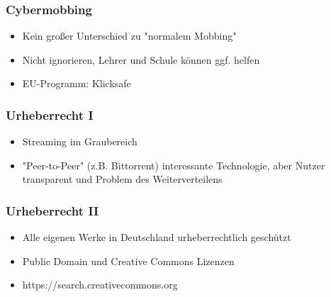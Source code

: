 \begin{frame}
  \frametitle{Cybermobbing}
  \begin{itemize}
    \item<2-> Kein großer Unterschied zu "normalem Mobbing"
    \item<3-> Nicht ignorieren, Lehrer und Schule können ggf. helfen
    \item<4-> EU-Programm: Klicksafe
  \end{itemize}
\end{frame}

\begin{frame}
  \frametitle{Urheberrecht I}
  \begin{itemize}
    \item<2-> Streaming im Graubereich
    \item<3-> "Peer-to-Peer" (z.B. Bittorrent) interessante Technologie, aber Nutzer transparent und Problem des Weiterverteilens
  \end{itemize}
\end{frame}

\begin{frame}
  \frametitle{Urheberrecht II}
  \begin{itemize}
    \item<2-> Alle eigenen Werke in Deutschland urheberrechtlich geschützt
    \item<3-> Public Domain und Creative Commons Lizenzen
    \item<4-> https://search.creativecommons.org
  \end{itemize}
\end{frame}